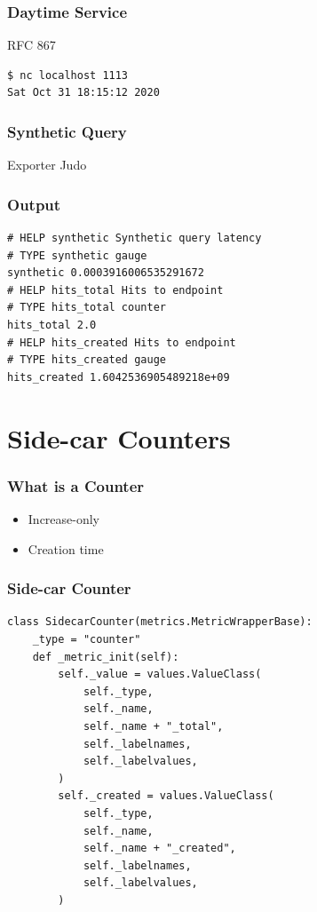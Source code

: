 \begin{frame}[fragile]
\frametitle{Daytime Service}
RFC 867\pause

\begin{lstlisting}
$ nc localhost 1113
Sat Oct 31 18:15:12 2020
\end{lstlisting}

\end{frame}

\begin{frame}[fragile]
\frametitle{Synthetic Query}
Exporter Judo\pause



\end{frame}

\begin{frame}[fragile]
\frametitle{Output}

\begin{lstlisting}
# HELP synthetic Synthetic query latency
# TYPE synthetic gauge
synthetic 0.0003916006535291672
# HELP hits_total Hits to endpoint
# TYPE hits_total counter
hits_total 2.0
# HELP hits_created Hits to endpoint
# TYPE hits_created gauge
hits_created 1.6042536905489218e+09
\end{lstlisting}

\end{frame}

\section{Side-car Counters}

\begin{frame}
\frametitle{What is a Counter}

\begin{itemize}
\item Increase-only
\item Creation time
\end{itemize}

\end{frame}

\begin{frame}[fragile]
\frametitle{Side-car Counter}

\begin{lstlisting}
class SidecarCounter(metrics.MetricWrapperBase):
    _type = "counter"
    def _metric_init(self):
        self._value = values.ValueClass(
            self._type,
            self._name,
            self._name + "_total",
            self._labelnames,
            self._labelvalues,
        )
        self._created = values.ValueClass(
            self._type,
            self._name,
            self._name + "_created",
            self._labelnames,
            self._labelvalues,
        )
 \end{lstlisting}
 \end{frame}
 

